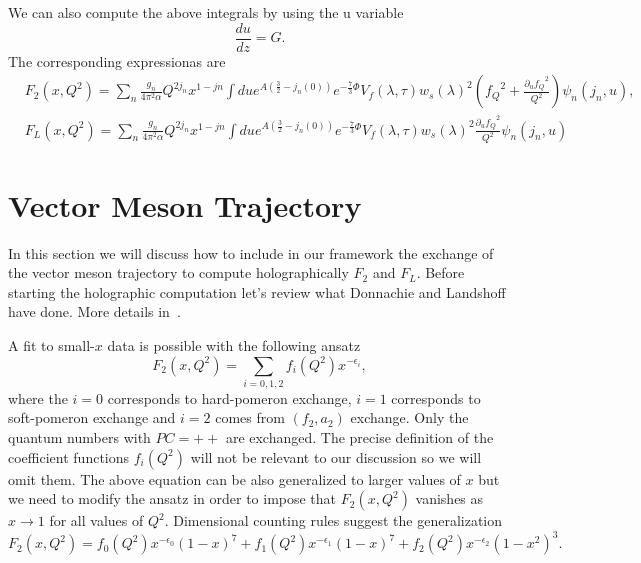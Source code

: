 \documentclass[10 pt]{article}
\begin{document}
We can also compute the above integrals by using the u variable
\begin{equation}
\frac{du}{dz} = G.
\end{equation}
The corresponding expressionas are
\begin{align}
 &F_2\left(x, Q^2\right) = \sum_n \frac{g_n}{4 \pi^2 \alpha} Q^{2 j_n} x^{1-jn} \int du e^{A(\frac{3}{2} - {j_n\left(0\right)})} e^{-\frac{7}{3} \Phi}  V_f \left( \lambda, \tau \right) {w_s\left(\lambda \right)}^2  \left(  {f_Q}^2 + \frac{{\partial_u f_Q}^2}{Q^2}  \right) \psi_n \left(j_n, u\right), \\
& F_L\left(x, Q^2\right) = \sum_n \frac{g_n}{4 \pi^2 \alpha} Q^{2 j_n} x^{1-jn} \int du e^{A(\frac{3}{2} - {j_n\left(0\right)})} e^{-\frac{7}{3} \Phi}  V_f \left( \lambda, \tau \right) {w_s\left(\lambda \right)}^2  \frac{{\partial_u f_Q}^2}{Q^2} \psi_n \left(j_n, u\right)
\end{align}

\section{Vector Meson Trajectory}

In this section we will discuss how to include in our framework the exchange of the vector meson trajectory to compute holographically $F_2$ and $F_L$. Before starting the holographic computation let's review what Donnachie and Landshoff have done. More details in~\cite{donnachie_dosch_landshoff_nachtmann_2002}.

A fit to small-$x$ data is possible with the following ansatz
\begin{equation}
F_2 \left(x, Q^2\right) = \sum_{i = 0, 1, 2} f_i\left(Q^2\right) x^{- \epsilon_i},
\end{equation}
 where the $i=0$ corresponds to hard-pomeron exchange, $i=1$ corresponds to soft-pomeron exchange and $i = 2$ comes from $(f_2, a_2)$ exchange. Only the quantum numbers with $PC=++$ are exchanged.
 The precise definition of the coefficient functions $f_i\left(Q^2\right)$ will not be relevant to our discussion so we will omit them. The above equation can be also generalized to larger values of $x$ but we need to modify the ansatz in order to impose that $F_2\left(x, Q^2\right)$ vanishes as $x \rightarrow 1$ for all values of $Q^2$. Dimensional counting rules suggest the generalization
\begin{equation}
F_2\left(x, Q^2\right) = f_0 \left(Q^2\right) x^{-\epsilon_0} {\left(1-x\right)}^7 +  f_1 \left(Q^2\right) x^{-\epsilon_1} {\left(1-x\right)}^7 +  f_2 \left(Q^2\right) x^{-\epsilon_2} {\left(1-x^2\right)}^3.
\end{equation} 
\end{document}
